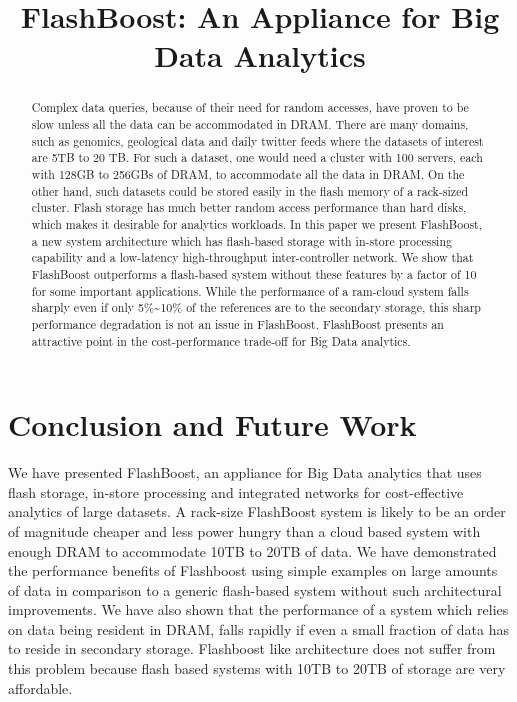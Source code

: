 \documentclass[pageno]{jpaper}
\begin{document}
\title{
FlashBoost: An Appliance for Big Data Analytics
}

\date{}
\maketitle


\begin{abstract}
Complex data queries, because of their need for random accesses, have proven to be slow unless all the data can be accommodated in DRAM. There are many domains, such as genomics, geological data and daily twitter feeds where the datasets of interest are 5TB to 20 TB. For such a dataset, one would need a cluster with 100 servers, each with 128GB to 256GBs of DRAM, to accommodate all the data in DRAM. On the other hand, such datasets could be stored easily in the flash memory of a rack-sized cluster. Flash storage has much better random access performance than hard disks, which makes it desirable for analytics workloads. In this paper we present FlashBoost, a new system architecture which has flash-based storage with in-store processing capability and a low-latency high-throughput inter-controller network.  We show that FlashBoost outperforms a flash-based system without these features by a factor of 10 for some important applications. While the performance of a ram-cloud system falls sharply even if only 5\%\textasciitilde10\% of the references are to the secondary storage, this sharp performance degradation is not an issue in FlashBoost. FlashBoost presents an attractive point in the cost-performance trade-off for Big Data analytics. 
\end{abstract}



%







%

\section{Conclusion and Future Work}
\label{sec:conclusion}

We have presented FlashBoost, an appliance for Big Data analytics that uses
flash storage, in-store processing and integrated networks for cost-effective
analytics of large datasets. A rack-size FlashBoost system is likely to be an
order of magnitude cheaper and less power hungry than a cloud based system with
enough DRAM to accommodate 10TB to 20TB of data. We have demonstrated the
performance benefits of Flashboost using simple examples on large amounts of
data in comparison to a generic flash-based system without such architectural
improvements. We have also shown that the performance of a system which relies
on data being resident in DRAM, falls rapidly if even a small fraction of data
has to reside in secondary storage. Flashboost like architecture does not suffer
from this problem because flash based systems with 10TB to 20TB of storage are
very affordable.
\end{document}
